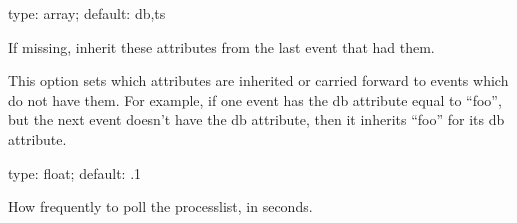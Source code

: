 \documentclass[letterpaper,10pt,english]{sphinxmanual}
\begin{document}
\begin{fulllineitems}
\label{\detokenize{mariadb-query-digest:cmdoption-mariadb-query-digest-inherit-attributes}}
type: array; default: db,ts

If missing, inherit these attributes from the last event that had them.

This option sets which attributes are inherited or carried forward to events
which do not have them.  For example, if one event has the db attribute equal
to “foo”, but the next event doesn’t have the db attribute, then it inherits
“foo” for its db attribute.

\end{fulllineitems}


\begin{fulllineitems}
\label{\detokenize{mariadb-query-digest:cmdoption-mariadb-query-digest-interval}}
type: float; default: .1

How frequently to poll the processlist, in seconds.

\end{fulllineitems}

\end{document}
